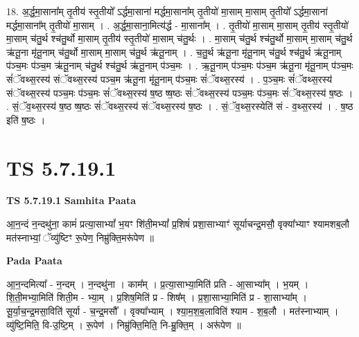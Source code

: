 \documentclass[17pt]{extarticle}
\begin{document}
18. अ॒र्द्ध॒मा॒साना᳚म् तृ॒तीय॑ स्तृ॒तीयो᳚ ऽर्द्धमा॒साना॑ मर्द्धमा॒साना᳚म् तृ॒तीयो॑ मा॒साम् मा॒साम् तृ॒तीयो᳚ ऽर्द्धमा॒साना॑ मर्द्धमा॒साना᳚म् तृ॒तीयो॑ मा॒साम् । . अ॒र्द्ध॒मा॒साना॒मित्य॑र्द्ध - मा॒साना᳚म् । . तृ॒तीयो॑ मा॒साम् मा॒साम् तृ॒तीय॑ स्तृ॒तीयो॑ मा॒साम् च॑तु॒र्थ श्च॑तु॒र्थो मा॒साम् तृ॒तीय॑ स्तृ॒तीयो॑ मा॒साम् च॑तु॒र्थः । . मा॒साम् च॑तु॒र्थ श्च॑तु॒र्थो मा॒साम् मा॒साम् च॑तु॒र्थ ऋ॑तू॒ना मृ॑तू॒नाम् च॑तु॒र्थो मा॒साम् मा॒साम् च॑तु॒र्थ ऋ॑तू॒नाम् । . च॒तु॒र्थ ऋ॑तू॒ना मृ॑तू॒नाम् च॑तु॒र्थ श्च॑तु॒र्थ ऋ॑तू॒नाम् प॑ञ्च॒मः प॑ञ्च॒म ऋ॑तू॒नाम् च॑तु॒र्थ श्च॑तु॒र्थ ऋ॑तू॒नाम् प॑ञ्च॒मः । . ऋ॒तू॒नाम् प॑ञ्च॒मः प॑ञ्च॒म ऋ॑तू॒ना मृ॑तू॒नाम् प॑ञ्च॒मः सं॑ॅवथ्स॒रस्य॑ संॅवथ्स॒रस्य॑ पञ्च॒म ऋ॑तू॒ना मृ॑तू॒नाम् प॑ञ्च॒मः सं॑ॅवथ्स॒रस्य॑ । . प॒ञ्च॒मः सं॑ॅवथ्स॒रस्य॑ संॅवथ्स॒रस्य॑ पञ्च॒मः प॑ञ्च॒मः सं॑ॅवथ्स॒रस्य॑ ष॒ष्ठ ष्ष॒ष्ठः सं॑ॅवथ्स॒रस्य॑ पञ्च॒मः प॑ञ्च॒मः सं॑ॅवथ्स॒रस्य॑ ष॒ष्ठः । . सं॒ॅव॒थ्स॒रस्य॑ ष॒ष्ठ ष्ष॒ष्ठः सं॑ॅवथ्स॒रस्य॑ संॅवथ्स॒रस्य॑ ष॒ष्ठः । . सं॒ॅव॒थ्स॒रस्येति॑ सं - व॒थ्स॒रस्य॑ । . ष॒ष्ठ इति॑ ष॒ष्ठः । \newline
\pagebreak
{}

\section{ TS 5.7.19.1 }

\textbf{TS 5.7.19.1 } \newline
\textbf{Samhita Paata} \newline

आ॒न॒न्दं न॒न्दथु॑ना॒ कामं॑ प्रत्या॒साभ्यां᳚ भ॒यꣳ शि॑ती॒मभ्यां᳚ प्र॒शिषं॑ प्रशा॒साभ्याꣳ॑ सूर्याचन्द्र॒मसौ॒ वृक्या᳚भ्याꣳ श्यामशब॒लौ मत॑स्नाभ्यां॒ ॅव्यु॑ष्टिꣳ रू॒पेण॒ निम्रु॑क्ति॒मरू॑पेण ॥ \newline

\textbf{Pada Paata} \newline

आ॒न॒न्दमित्या᳚ - न॒न्दम् । न॒न्दथु॑ना । काम᳚म् । प्र॒त्या॒साभ्या॒मिति॑ प्रति - आ॒साभ्या᳚म् । भ॒यम् । शि॒ती॒मभ्या॒मिति॑ शिती॒म - भ्या॒म् । प्र॒शिष॒मिति॑ प्र - शिष᳚म् । प्र॒शा॒साभ्या॒मिति॑ प्र - शा॒साभ्या᳚म् । सू॒र्या॒च॒न्द्र॒मसा॒विति॑ सूर्या - च॒न्द्र॒मसौ᳚ । वृक्या᳚भ्याम् । श्या॒म॒श॒ब॒लाविति॑ श्याम - श॒ब॒लौ । मत॑स्नाभ्याम् । व्यु॑ष्टि॒मिति॒ वि-उ॒ष्टि॒म् । रू॒पेण॑ । निम्रु॑क्ति॒मिति॒ नि-म्रु॒क्ति॒म् । अरू॑पेण ॥  \newline
\end{document}

